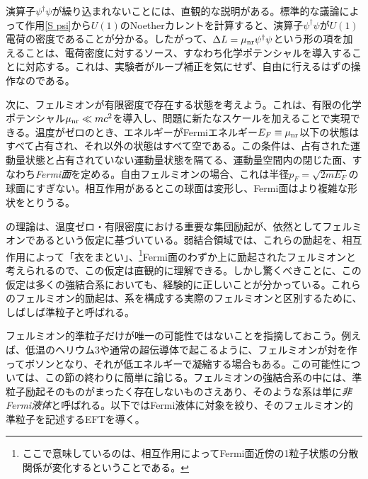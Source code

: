演算子$\psi^\dag \psi$が繰り込まれないことには、直観的な説明がある。標準的な議論によって作用\eqref{S psi}から$U(1)$のNoetherカレントを計算すると、演算子$\psi^\dag \psi$が$U(1)$電荷の密度であることが分かる。したがって、$\Delta L = \mu_{\rm nr} \psi^\dag \psi$という形の項を加えることは、電荷密度に対するソース、すなわち化学ポテンシャルを導入することに対応する。これは、実験者がループ補正を気にせず、自由に行えるはずの操作なのである。





 
次に、フェルミオンが有限密度で存在する状態を考えよう。これは、有限の化学ポテンシャル$\mu_{\rm nr} \ll m c^2$を導入し、問題に新たなスケールを加えることで実現できる。温度がゼロのとき、エネルギーがFermiエネルギー$E_F \equiv \mu_{\rm nr}$以下の状態はすべて占有され、それ以外の状態はすべて空である。この条件は、占有された運動量状態と占有されていない運動量状態を隔てる、運動量空間内の閉じた面、すなわち\emph{Fermi面}を定める。自由フェルミオンの場合、これは半径$p_F = \sqrt{2 m E_F}$の球面にすぎない。相互作用があるとこの球面は変形し、Fermi面はより複雑な形状をとりうる。

の理論は、温度ゼロ・有限密度における重要な集団励起が、依然としてフェルミオンであるという仮定に基づいている。弱結合領域では、これらの励起を、相互作用によって「衣をまとい」、\footnote{ここで意味しているのは、相互作用によってFermi面近傍の1粒子状態の分散関係が変化するということである。}Fermi面のわずか上に励起されたフェルミオンと考えられるので、この仮定は直観的に理解できる。しかし驚くべきことに、この仮定は多くの強結合系においても、経験的に正しいことが分かっている。これらのフェルミオン的励起は、系を構成する実際のフェルミオンと区別するために、しばしば準粒子と呼ばれる。

フェルミオン的準粒子だけが唯一の可能性ではないことを指摘しておこう。例えば、低温のヘリウム3や通常の超伝導体で起こるように、フェルミオンが対を作ってボソンとなり、それが低エネルギーで凝縮する場合もある。この可能性については、この節の終わりに簡単に論じる。フェルミオンの強結合系の中には、準粒子励起そのものがまったく存在しないものさえあり、そのような系は単に\emph{非Fermi液体}と呼ばれる。以下ではFermi液体に対象を絞り、そのフェルミオン的準粒子を記述するEFTを導く。

